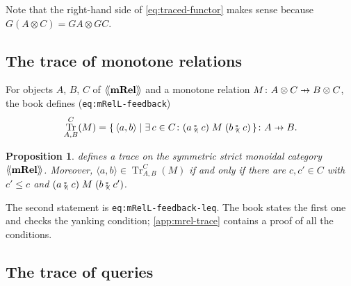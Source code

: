 \documentclass[11pt,a4paper]{article}
\theoremstyle{plain}
\newtheorem{proposition}[theorem]{Proposition}
\theoremstyle{definition}
\theoremstyle{remark}
\newcommand{\Cat}[1]{\mathbf{#1}}
\newcommand{\mRel}{\Cat{mRel}}
\providecommand{\llangle}{\mathopen{\langle\mkern-3.5mu\langle}}
\providecommand{\rrangle}{\mathclose{\rangle\mkern-3.5mu\rangle}}
\newcommand{\tL}[1]{\llangle #1 \rrangle}
\newcommand{\tc}{\mathbin{\fatsemi_{\!\scriptscriptstyle\langle}}}
\newcommand{\tup}[1]{\langle #1 \rangle}
\newcommand{\profto}{\mathrel{\ooalign{\hfil$\mapstochar\mkern 5mu$\hfil\cr$\to$\cr}}}
\newcommand{\rel}[3]{#1 \mathrel{#2} #3}
\DeclareMathOperator{\Tr}{Tr}
\newcommand{\lbl}[1]{\nolinkurl{#1}}
\begin{document}
Note that the right-hand side of \cref{eq:traced-functor} makes sense because $G(A \otimes C) = GA \otimes GC$.

\subsection{The trace of monotone relations}

For objects $A$, $B$, $C$ of $\tL{\mRel}$ and a monotone relation $M \colon A \otimes C \profto B \otimes C$, the book defines (\lbl{eq:mRelL-feedback})
\begin{equation}
    \label{eq:mRelL-trace}
    \Tr^{C}_{A,B}(M) = \{\, \tup{a,b} \mid \exists\, c \in C \colon \rel{(a \tc c)}{M}{(b \tc c)} \,\} \colon A \profto B.
\end{equation}

\begin{proposition}
    \label{prop:mRelL-trace}
     defines a trace on the symmetric strict monoidal category $\tL{\mRel}$.
    Moreover, $\tup{a,b} \in \Tr^{C}_{A,B}(M)$ if and only if there are $c, c' \in C$ with $c' \leq c$ and $\rel{(a \tc c)}{M}{(b \tc c')}$.
\end{proposition}

The second statement is \lbl{eq:mRelL-feedback-leq}.
The book states the first one and checks the yanking condition; \cref{app:mrel-trace} contains a proof of all the conditions.

\subsection{The trace of queries}
\end{document}
